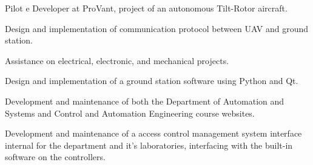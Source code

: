 \documentclass[A4]{deedy-resume} %
\begin{document}
\begin{minipage}[t]{0.66\textwidth}
\sectionspace %

\vspace{\topsep}
\begin{tightitemize}
 \item Pilot e Developer at ProVant, project of an autonomous  Tilt-Rotor aircraft.
 \item Design and implementation of communication protocol between UAV and ground station.
 \item Assistance on electrical, electronic, and mechanical projects.
 \item Design and implementation of a ground station software using  Python and Qt.

\end{tightitemize}

\sectionspace %

\begin{tightitemize}
 \item Development and maintenance of both the Department of Automation and Systems and Control and Automation Engineering course websites.
\end{tightitemize}

\sectionspace %

\begin{tightitemize}
 \item Development and maintenance of a access control management system interface internal for the department and it's laboratories, interfacing with the built-in software on the controllers.
\end{tightitemize}

\sectionspace %







\end{minipage}
\end{document}
